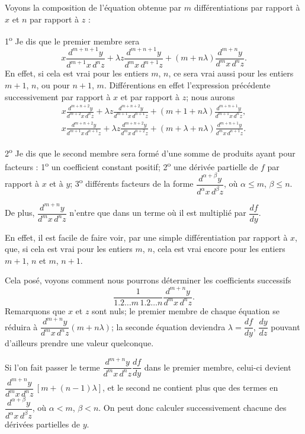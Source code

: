 \documentclass[11pt]{article}
\begin{document}
Voyons la composition de l’équation obtenue par $m$ différentiations par rapport à $x$ et $n$ par rapport à $z$ :

1\textsuperscript{o} Je dis que le premier membre sera
\[
x\frac{d^{m+n+1}y}{d^{m+1}x\,d^nz}+\lambda z\frac{d^{m+n+1}y}{d^m x\,d^{n+1}z}+(m+n\lambda)\frac{d^{m+n}y}{d^m x\,d^nz}.
\]
En effet, si cela est vrai pour les entiers $m$, $n$, ce sera vrai aussi pour les entiers $m+1$, $n$, ou pour $n+1$, $m$. Différentions en effet l’expression précédente successivement par rapport à $x$ et par rapport à $z$; nous aurons
\begin{align*}
x\frac{d^{m+n+2}y}{d^{m+2}x\,d^nz}+\lambda z\frac{d^{m+n+2}y}{d^{m+1}x\,d^{n+1}z}+(m+1+n\lambda)\frac{d^{m+n+1}y}{d^{m+1}x\,d^nz},\\
x\frac{d^{m+n+2}y}{d^{m+1}x\,d^{n+1}z}+\lambda z\frac{d^{m+n+2}y}{d^m x\,d^{n+2}z}+(m+\lambda+n\lambda)\frac{d^{m+n+1}y}{d^m x\,d^{n+1}z}.
\end{align*}

2\textsuperscript{o} Je dis que le second membre sera formé d’une somme de produits ayant pour facteurs : 1\textsuperscript{o} un coefficient constant positif; 2\textsuperscript{o} une dérivée partielle de $f$ par rapport à $x$ et à $y$; 3\textsuperscript{o} différents facteurs de la forme $\dfrac{d^{\alpha+\beta}y}{d^\alpha x\,d^\beta z}$, où $\alpha\le m$, $\beta\le n$.

De plus, $\dfrac{d^{m+n}y}{d^m x\,d^n z}$ n’entre que dans un terme où il est multiplié par $\dfrac{df}{dy}$.

En effet, il est facile de faire voir, par une simple différentiation par rapport à $x$, que, si cela est vrai pour les entiers $m$, $n$, cela est vrai encore pour les entiers $m+1$, $n$ et $m$, $n+1$.

Cela posé, voyons comment nous pourrons déterminer les coefficients successifs
\[
\frac{1}{1.2\ldots m\,1.2\ldots n}\frac{d^{m+n}y}{d^m x\,d^nz}.
\]
Remarquons que $x$ et $z$ sont nuls; le premier membre de chaque équation se réduira à $\dfrac{d^{m+n}y}{d^m x\,d^nz}(m+n\lambda)$; la seconde équation deviendra $\lambda=\dfrac{df}{dy}$, $\dfrac{dy}{dz}$ pouvant d’ailleurs prendre une valeur quelconque.

Si l’on fait passer le terme $\dfrac{d^{m+n}y}{d^m x\,d^n z}\dfrac{df}{dy}$ dans le premier membre, celui-ci devient $\dfrac{d^{m+n}y}{d^m x\,d^n z}\,[m+(n-1)\lambda]$, et le second ne contient plus que des termes en $\dfrac{d^{\alpha+\beta}y}{d^\alpha x\,d^\beta z}$, où $\alpha<m$, $\beta<n$. On peut donc calculer successivement chacune des dérivées partielles de $y$.
\end{document}
